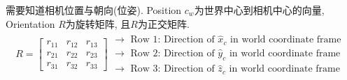 需要知道相机位置与朝向(位姿). Position $c_w$为世界中心到相机中心的向量, Orientation $R$为旋转矩阵, 且$R$为正交矩阵. 
\begin{align*}
    R=\begin{bmatrix}
        r_{11} & r_{12} & r_{13} \\
        r_{21} & r_{22} & r_{23} \\
        r_{31} & r_{32} & r_{33}
    \end{bmatrix}\begin{matrix}
        \longrightarrow \text { Row 1: Direction of } \hat{x}_{c} \text { in world coordinate frame }\\
        \longrightarrow \text { Row 2: Direction of } \hat{y}_{c} \text { in world coordinate frame }\\
        \longrightarrow \text { Row 3: Direction of } \hat{z}_{c} \text { in world coordinate frame }
    \end{matrix}
\end{align*}

